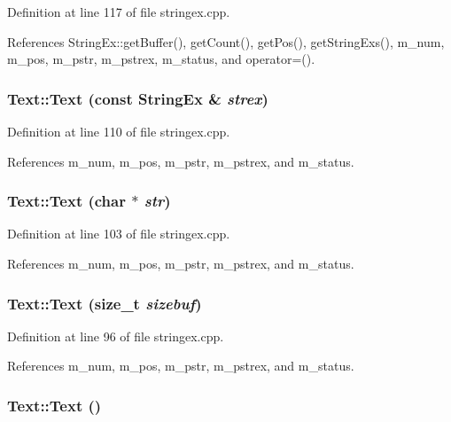 Definition at line 117 of file stringex.cpp.

References StringEx::getBuffer(), getCount(), getPos(), getStringExs(), m\_\-num, m\_\-pos, m\_\-pstr, m\_\-pstrex, m\_\-status, and operator=().\hypertarget{classText_7c16faed13664c424a1ad4a28c8eae1f}{
\subsubsection[{Text}]{\setlength{\rightskip}{0pt plus 5cm}Text::Text (const {\bf StringEx} \& {\em strex})}}
\label{classText_7c16faed13664c424a1ad4a28c8eae1f}




Definition at line 110 of file stringex.cpp.

References m\_\-num, m\_\-pos, m\_\-pstr, m\_\-pstrex, and m\_\-status.\hypertarget{classText_ac05156e2f6cabf1317e5cb33156daee}{
\subsubsection[{Text}]{\setlength{\rightskip}{0pt plus 5cm}Text::Text (char $\ast$ {\em str})}}
\label{classText_ac05156e2f6cabf1317e5cb33156daee}




Definition at line 103 of file stringex.cpp.

References m\_\-num, m\_\-pos, m\_\-pstr, m\_\-pstrex, and m\_\-status.\hypertarget{classText_db86317894cb1264b558a999090b9a68}{
\subsubsection[{Text}]{\setlength{\rightskip}{0pt plus 5cm}Text::Text (size\_\-t {\em sizebuf})}}
\label{classText_db86317894cb1264b558a999090b9a68}




Definition at line 96 of file stringex.cpp.

References m\_\-num, m\_\-pos, m\_\-pstr, m\_\-pstrex, and m\_\-status.\hypertarget{classText_b3e26143fccc52699bcc5149cae852bc}{
\subsubsection[{Text}]{\setlength{\rightskip}{0pt plus 5cm}Text::Text ()}}
\label{classText_b3e26143fccc52699bcc5149cae852bc}





